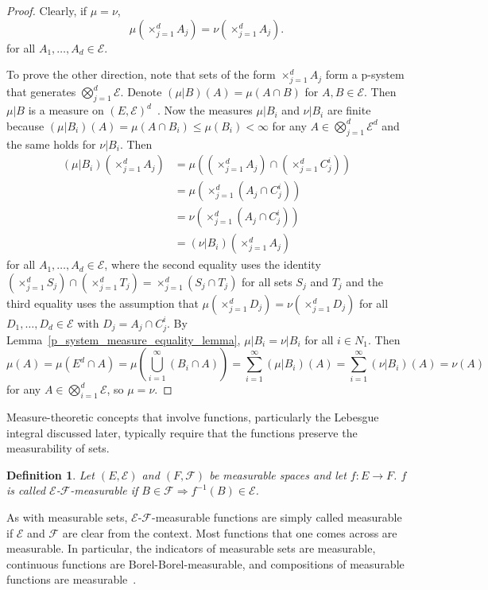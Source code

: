 \documentclass[english,twoside,openright]{HYgraduMLDS}
\newtheorem{definition}[lemma]{Definition}
\DeclareMathOperator*{\bigtimes}{\times}
\begin{document}
\begin{proof}
	Clearly, if \(\mu = \nu\),
  \[
    \mu\left(\bigtimes_{j=1}^{d}A_{j}\right)
    = \nu\left(\bigtimes_{j=1}^{d}A_{j}\right).
  \]
  for all \(A_{1},\dotsc, A_{d} \in \mathcal{E}\).

  To prove the other direction, note that sets of the form
  \(\bigtimes_{j=1}^{d}A_{j}\) form a p-system that generates
  \(\bigotimes_{j=1}^{d}\mathcal{E}\). Denote \((\mu| B)(A) =\mu(A\cap B)\)
  for \(A, B\in \mathcal{E}\).
  Then \(\mu| B\) is a measure on \((E, \mathcal{E})^{d}\)~\cite{Cin11}.
  Now the measures \(\mu|B_{i}\) and \(\nu|B_{i}\) are finite because
  \((\mu|B_{i})(A) = \mu(A\cap B_{i}) \leq \mu(B_{i}) < \infty\) for any
  \(A\in \bigotimes_{j=1}^{d}\mathcal{E}^{d}\) and the same holds for \(\nu|B_{i}\).
  Then
  \begin{align*}
    (\mu|B_{i})\left(\bigtimes_{j=1}^{d}A_{j}\right)
    &= \mu\left(\left(\bigtimes_{j=1}^{d}A_{j}\right)
      \cap \left(\bigtimes_{j=1}^{d}C_{j}^{i}\right)\right)
    \\&= \mu\left(\bigtimes_{j=1}^{d}(A_{j} \cap C_{j}^{i})\right)
    \\&= \nu\left(\bigtimes_{j=1}^{d}(A_{j} \cap C_{j}^{i})\right)
    \\&= (\nu|B_{i})\left(\bigtimes_{j=1}^{d}A_{j}\right)
  \end{align*}
  for all \(A_{1}, \dotsc, A_{d}\in \mathcal{E}\), where the second equality
  uses the identity
  \(\left(\bigtimes_{j=1}^{d}S_{j}\right)
  \cap\left(\bigtimes_{j=1}^{d} T_{j}\right)
  = \bigtimes_{j=1}^{d}(S_{j}\cap T_{j})\)
  for all sets \(S_{j}\) and \(T_{j}\)
  and the third equality uses the assumption that
  \(\mu\left(\bigtimes_{j=1}^{d}D_{j}\right)
  = \nu\left(\bigtimes_{j=1}^{d} D_{j}\right)\)
  for all \(D_{1},\dotsc,D_{d}\in \mathcal{E}\) with
  \(D_{j} = A_{j}\cap C_{j}^{i}\).
  By Lemma~\ref{p_system_measure_equality_lemma},
  \(\mu|B_{i} = \nu|B_{i}\) for all \(i\in N_{1}\). Then
  \[
    \mu(A) = \mu(E^{d}\cap A)
    = \mu\left(\bigcup_{i=1}^{\infty}(B_{i}\cap A)\right)
    = \sum_{i=1}^{\infty}(\mu|B_{i})(A)
    = \sum_{i=1}^{\infty}(\nu|B_{i})(A)
    = \nu(A)
  \]
  for any \(A\in \bigotimes_{i=1}^{d}\mathcal{E}\), so \(\mu = \nu\).
\end{proof}

Measure-theoretic concepts that involve functions, particularly the
Lebesgue integral discussed later, typically require that the functions
preserve the measurability of sets.
\begin{definition}
	Let \((E, \mathcal{E})\) and \((F, \mathcal{F})\) be measurable spaces
  and let \(f\colon E\to F\). \(f\) is called
  \(\mathcal{E}\)-\(\mathcal{F}\)-measurable if
  \(B\in \mathcal{F}\Rightarrow f^{-1}(B)\in \mathcal{E}\).
\end{definition}
As with measurable sets, \(\mathcal{E}\)-\(\mathcal{F}\)-measurable functions
are simply called measurable if \(\mathcal{E}\) and \(\mathcal{F}\) are
clear from the context.
Most functions that one comes across are measurable. In particular,
the indicators of measurable sets are measurable, continuous functions
are Borel-Borel-measurable, and compositions of measurable functions
are measurable~\cite{Cin11}.
\end{document}
